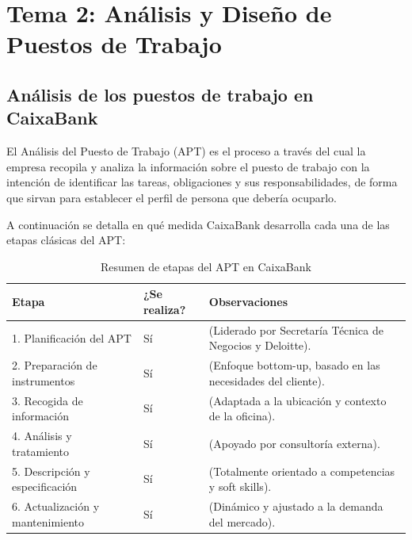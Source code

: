 %
%

\chapter{Tema 2: Análisis y Diseño de Puestos de Trabajo}


\section{Análisis de los puestos de trabajo en CaixaBank}


El Análisis del Puesto de Trabajo (APT) es el proceso a través del cual la empresa recopila y analiza la información sobre el puesto de trabajo con la intención de identificar las tareas, obligaciones y sus responsabilidades, de forma que sirvan para establecer el perfil de persona que debería ocuparlo.

A continuación se detalla en qué medida CaixaBank desarrolla cada una
de las etapas clásicas del APT:

\begin{table}[H]
  \centering
  \small
  \caption{Resumen de etapas del APT en CaixaBank}
  \begin{tabularx}{\textwidth}{p{} p{} X}
    \toprule
    \textbf{Etapa} & \textbf{¿Se realiza?} & \textbf{Observaciones} \\
    \midrule
    1. Planificación del APT          & Sí & (Liderado por Secretaría Técnica de Negocios y Deloitte). \\
    2. Preparación de instrumentos    & Sí & (Enfoque bottom-up, basado en las necesidades del cliente). \\
    3. Recogida de información        & Sí & (Adaptada a la ubicación y contexto de la oficina). \\
    4. Análisis y tratamiento         & Sí & (Apoyado por consultoría externa). \\
    5. Descripción y especificación   & Sí & (Totalmente orientado a competencias y soft skills). \\
    6. Actualización y mantenimiento  & Sí & (Dinámico y ajustado a la demanda del mercado). \\
    \bottomrule
  \end{tabularx}
\end{table}

